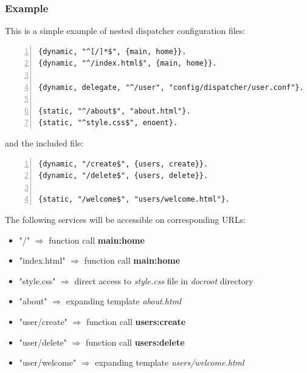 \subsubsection{Example}
This is a simple example of nested dispatcher configuration files:

\begin{Verbatim}[numbers=left, frame=single, label=dispatch.conf]
{dynamic, "^[/]*$", {main, home}}.
{dynamic, "^/index.html$", {main, home}}.

{dynamic, delegate, "^/user", "config/dispatcher/user.conf"}.

{static, "^/about$", "about.html"}.
{static, "^style.css$", enoent}.
\end{Verbatim}
and the included file:
\begin{Verbatim}[numbers=left, frame=single, label=user.conf]
{dynamic, "/create$", {users, create}}.
{dynamic, "/delete$", {users, delete}}.

{static, "/welcome$", "users/welcome.html"}.
\end{Verbatim}

The following services will be accessible on corresponding URLs:
\begin{itemize}
\item "/" $\Rightarrow$ function call {\bf main:home}
\item "index.html" $\Rightarrow$ function call {\bf main:home}
\item "style.css" $\Rightarrow$ direct access to {\it style.css} file in {\it docroot} directory
\item "about" $\Rightarrow$ expanding template {\it about.html}
\item "user/create" $\Rightarrow$ function call {\bf users:create}
\item "user/delete" $\Rightarrow$ function call {\bf users:delete}
\item "user/welcome" $\Rightarrow$ expanding template {\it users/welcome.html}
\end{itemize}
